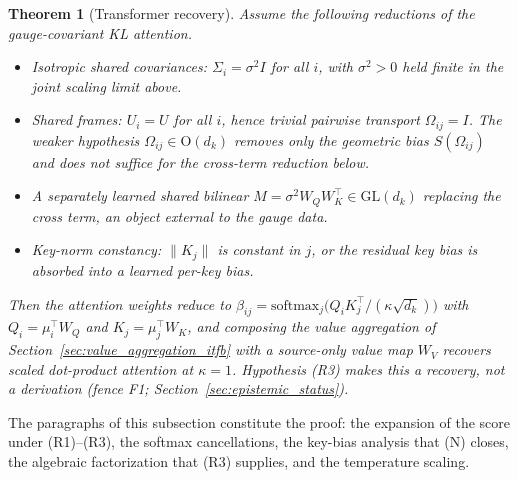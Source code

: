 \documentclass[11pt]{article}
\newtheorem{theorem}{Theorem}
\begin{document}
\begin{theorem}[Transformer recovery]
\label{thm:transformer_recovery}
Assume the following reductions of the gauge-covariant KL attention.
\begin{itemize}
\item[(R1)] Isotropic shared covariances: $\Sigma_i = \sigma^2 I$ for all $i$, with $\sigma^2 > 0$ held finite in the joint scaling limit above.
\item[(R2)] Shared frames: $U_i = U$ for all $i$, hence trivial pairwise transport $\Omega_{ij} = I$. The weaker hypothesis $\Omega_{ij} \in \mathrm{O}(d_k)$ removes only the geometric bias $S(\Omega_{ij})$ and does not suffice for the cross-term reduction below.
\item[(R3)] A separately learned shared bilinear $M = \sigma^2 W_QW_K^\top \in \mathrm{GL}(d_k)$ replacing the cross term, an object external to the gauge data.
\item[(N)] Key-norm constancy: $\|K_j\|$ is constant in $j$, or the residual key bias is absorbed into a learned per-key bias.
\end{itemize}
Then the attention weights reduce to $\beta_{ij} = \mathrm{softmax}_j\big(Q_iK_j^\top/(\kappa\sqrt{d_k})\big)$ with $Q_i = \mu_i^\top W_Q$ and $K_j = \mu_j^\top W_K$, and composing the value aggregation of Section~\ref{sec:value_aggregation_itfb} with a source-only value map $W_V$ recovers scaled dot-product attention at $\kappa = 1$. Hypothesis (R3) makes this a recovery, not a derivation (fence F1; Section~\ref{sec:epistemic_status}).
\end{theorem}

The paragraphs of this subsection constitute the proof: the expansion of the score under (R1)--(R3), the softmax cancellations, the key-bias analysis that (N) closes, the algebraic factorization that (R3) supplies, and the temperature scaling.
\end{document}
